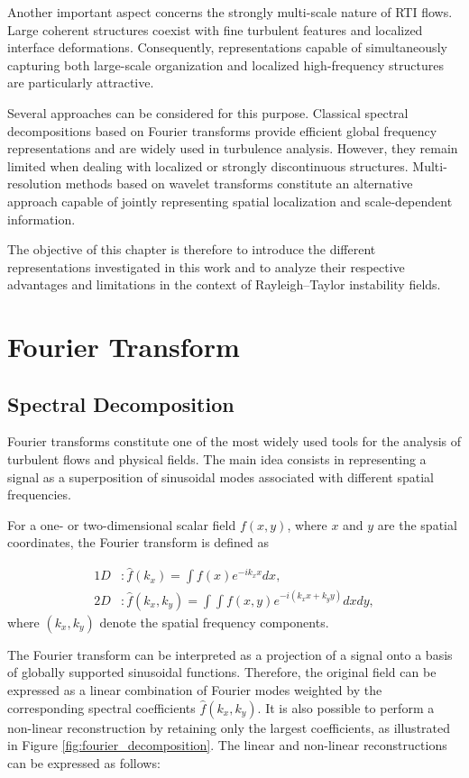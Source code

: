 Another important aspect concerns the strongly multi-scale nature of RTI flows. Large coherent structures coexist with fine turbulent features and localized interface deformations. Consequently, representations capable of simultaneously capturing both large-scale organization and localized high-frequency structures are particularly attractive.

Several approaches can be considered for this purpose. Classical spectral decompositions based on Fourier transforms provide efficient global frequency representations and are widely used in turbulence analysis. However, they remain limited when dealing with localized or strongly discontinuous structures. Multi-resolution methods based on wavelet transforms constitute an alternative approach capable of jointly representing spatial localization and scale-dependent information.

The objective of this chapter is therefore to introduce the different representations investigated in this work and to analyze their respective advantages and limitations in the context of Rayleigh--Taylor instability fields.

\section{Fourier Transform}

\subsection{Spectral Decomposition}

Fourier transforms constitute one of the most widely used tools for the analysis of turbulent flows and physical fields. The main idea consists in representing a signal as a superposition of sinusoidal modes associated with different spatial frequencies.

For a one- or two-dimensional scalar field $f(x,y)$, where $x$ and $y$ are the spatial coordinates, the Fourier transform is defined as


\begin{align}
    1D&: \hat{f}(k_x) = \int f(x) e^{-i k_x x} dx, \\
    2D&: \hat{f}(k_x,k_y) = \int\int f(x,y) e^{-i(k_x x + k_y y)} dx dy,  
\end{align}
where $(k_x,k_y)$ denote the spatial frequency components.

The Fourier transform can be interpreted as a projection of a signal onto a basis of globally supported sinusoidal functions. Therefore, the original field can be expressed as a linear combination of Fourier modes weighted by the corresponding spectral coefficients $\hat{f}(k_x,k_y)$. It is also possible to perform a non-linear reconstruction by retaining only the largest coefficients, as illustrated in Figure \ref{fig:fourier_decomposition}. The linear and non-linear reconstructions can be expressed as follows:

